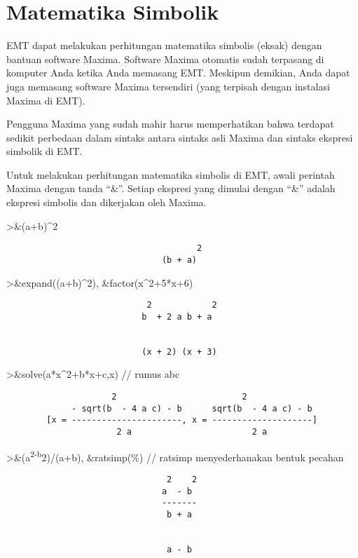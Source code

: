 \documentclass[
]{book}
\begin{document}
\chapter{Matematika Simbolik}\label{matematika-simbolik}

EMT dapat melakukan perhitungan matematika simbolis (eksak) dengan bantuan software Maxima. Software Maxima otomatis sudah terpasang di komputer Anda ketika Anda memasang EMT. Meskipun demikian, Anda dapat juga memasang software Maxima tersendiri (yang terpisah dengan instalasi Maxima di EMT).

Pengguna Maxima yang sudah mahir harus memperhatikan bahwa terdapat sedikit perbedaan dalam sintaks antara sintaks asli Maxima dan sintaks ekspresi simbolik di EMT.

Untuk melakukan perhitungan matematika simbolis di EMT, awali perintah Maxima dengan tanda ``\&''. Setiap ekspresi yang dimulai dengan ``\&'' adalah ekspresi simbolis dan dikerjakan oleh Maxima.

\textgreater\&(a+b)\^{}2

\begin{verbatim}
                                      2
                               (b + a)
\end{verbatim}

\textgreater\&expand((a+b)\^{}2), \&factor(x\^{}2+5*x+6)

\begin{verbatim}
                            2            2
                           b  + 2 a b + a


                           (x + 2) (x + 3)
\end{verbatim}

\textgreater\&solve(a*x\^{}2+b*x+c,x) // rumus abc

\begin{verbatim}
                     2                         2
             - sqrt(b  - 4 a c) - b      sqrt(b  - 4 a c) - b
        [x = ----------------------, x = --------------------]
                      2 a                        2 a
\end{verbatim}

\textgreater\&(a\textsuperscript{2-b}2)/(a+b), \&ratsimp(\%) // ratsimp menyederhanakan bentuk pecahan

\begin{verbatim}
                                2    2
                               a  - b
                               -------
                                b + a


                                a - b
\end{verbatim}
\end{document}
